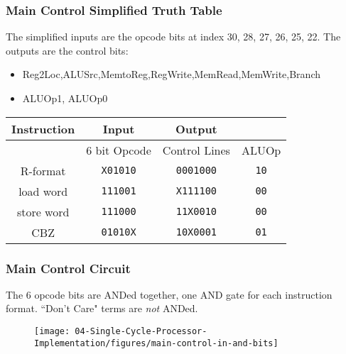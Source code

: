 \begin{frame}\frametitle{Main Control Simplified Truth Table}
The simplified inputs are the opcode bits at index  30, 28, 27, 26, 25, 22.
\hfill\break
The outputs are the control bits:
\begin{itemize}
\item Reg2Loc,ALUSrc,MemtoReg,RegWrite,MemRead,MemWrite,Branch
\item ALUOp1, ALUOp0
\end{itemize}
\begin{center}
\begin{tabular}{c|c|c|c}
Instruction &  Input & \multicolumn{1}{|c}{Output} \\\hline
           & 6 bit Opcode & Control Lines & ALUOp\\\hline
R-format   & \texttt{X01010} & \texttt{0001000} & \texttt{10} \\\hline
load word  & \texttt{111001} & \texttt{X111100} & \texttt{00} \\\hline
store word & \texttt{111000} & \texttt{11X0010} & \texttt{00} \\\hline
CBZ        & \texttt{01010X} & \texttt{10X0001} & \texttt{01} \\\hline
\end{tabular}
\end{center}
\end{frame}

\begin{frame}\frametitle{Main Control Circuit}

The 6 opcode bits are ANDed together, one AND gate for each instruction format. ``Don't Care" terms are \emph{not} ANDed.

\begin{figure}[H]
\centering
	{\texttt{[image: 04-Single-Cycle-Processor-Implementation/figures/main-control-in-and-bits]}}
\end{figure}
\end{frame}






